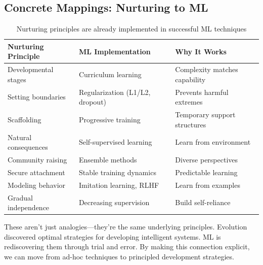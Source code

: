 \subsection{Concrete Mappings: Nurturing to ML}

\begin{table}[h]
\centering
\begin{tabular}{@{}lll@{}}
\toprule
\textbf{Nurturing Principle} & \textbf{ML Implementation} & \textbf{Why It Works} \\
\midrule
Developmental stages & Curriculum learning & Complexity matches capability \\
Setting boundaries & Regularization (L1/L2, dropout) & Prevents harmful extremes \\
Scaffolding & Progressive training & Temporary support structures \\
Natural consequences & Self-supervised learning & Learn from environment \\
Community raising & Ensemble methods & Diverse perspectives \\
Secure attachment & Stable training dynamics & Predictable learning \\
Modeling behavior & Imitation learning, RLHF & Learn from examples \\
Gradual independence & Decreasing supervision & Build self-reliance \\
\bottomrule
\end{tabular}
\caption{Nurturing principles are already implemented in successful ML techniques}
\label{tab:parenting-ml-mapping}
\end{table}

These aren't just analogies---they're the same underlying principles.
Evolution discovered optimal strategies for developing intelligent systems.
ML is rediscovering them through trial and error.
By making this connection explicit, we can move from ad-hoc techniques to principled development strategies.
